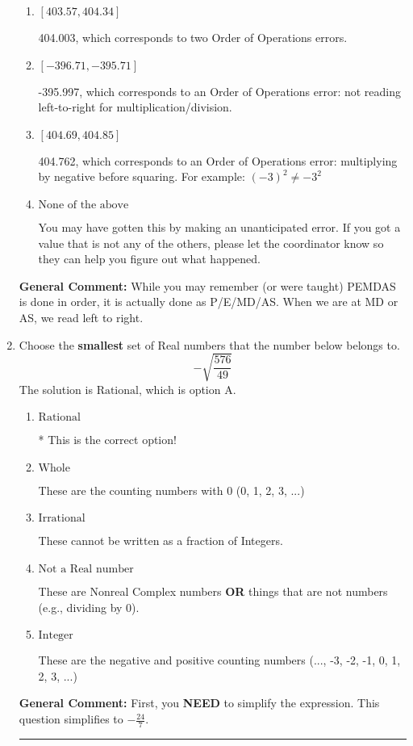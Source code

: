 \documentclass{extbook}[14pt]
\newcommand{\litem}[1]{\item #1

\rule{\textwidth}{0.4pt}}
\begin{document}
\begin{enumerate}
{\begin{enumerate}[label=\Alph*.]
* -395.238, this is the correct option
\item \( [403.57, 404.34] \)

 404.003, which corresponds to two Order of Operations errors.
\item \( [-396.71, -395.71] \)

 -395.997, which corresponds to an Order of Operations error: not reading left-to-right for multiplication/division.
\item \( [404.69, 404.85] \)

 404.762, which corresponds to an Order of Operations error: multiplying by negative before squaring. For example: $(-3)^2 \neq -3^2$
\item \( \text{None of the above} \)

 You may have gotten this by making an unanticipated error. If you got a value that is not any of the others, please let the coordinator know so they can help you figure out what happened.
\end{enumerate}

\textbf{General Comment:} While you may remember (or were taught) PEMDAS is done in order, it is actually done as P/E/MD/AS. When we are at MD or AS, we read left to right.
}
\litem{
Choose the \textbf{smallest} set of Real numbers that the number below belongs to.
\[ -\sqrt{\frac{576}{49}} \]The solution is \( \text{Rational} \), which is option A.\begin{enumerate}[label=\Alph*.]
\item \( \text{Rational} \)

* This is the correct option!
\item \( \text{Whole} \)

These are the counting numbers with 0 (0, 1, 2, 3, ...)
\item \( \text{Irrational} \)

These cannot be written as a fraction of Integers.
\item \( \text{Not a Real number} \)

These are Nonreal Complex numbers \textbf{OR} things that are not numbers (e.g., dividing by 0).
\item \( \text{Integer} \)

These are the negative and positive counting numbers (..., -3, -2, -1, 0, 1, 2, 3, ...)
\end{enumerate}

\textbf{General Comment:} First, you \textbf{NEED} to simplify the expression. This question simplifies to $-\frac{24}{7}$. 
 
}
\end{enumerate}
\end{document}
